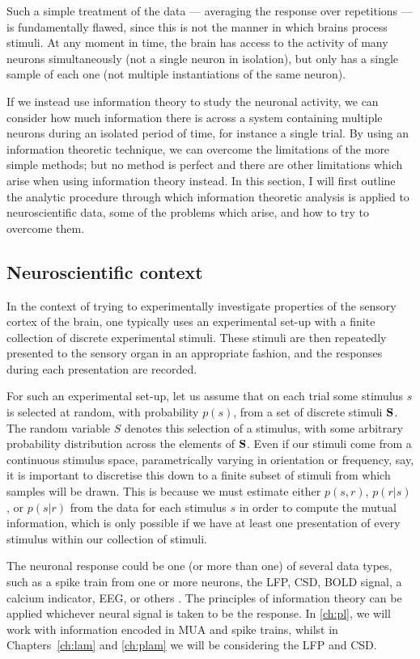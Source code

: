 Such a simple treatment of the data --- averaging the response over repetitions --- is fundamentally flawed, since this is not the manner in which brains process stimuli.
At any moment in time, the brain has access to the activity of many neurons simultaneously (not a single neuron in isolation), but only has a single sample of each one (not multiple instantiations of the same neuron).

If we instead use information theory to study the neuronal activity, we can consider how much information there is across a system containing multiple neurons during an isolated period of time, for instance a single trial.
By using an information theoretic technique, we can overcome the limitations of the more simple methods; but no method is perfect and there are other limitations which arise when using information theory instead.
In this section, I will first outline the analytic procedure through which information theoretic analysis is applied to neuroscientific data, some of the problems which arise, and how to try to overcome them.


\subsection{Neuroscientific context}

In the context of trying to experimentally investigate properties of the sensory cortex of the brain, one typically uses an experimental set-up with a finite collection of discrete experimental stimuli.
These stimuli are then repeatedly presented to the sensory organ in an appropriate fashion, and the responses during each presentation are recorded.

For such an experimental set-up, let us assume that on each trial some stimulus $s$ is selected at random, with probability $p(s)$, from a set of discrete stimuli $\mathbf{S}$.
The random variable $S$ denotes this selection of a stimulus, with some arbitrary probability distribution across the elements of $\mathbf{S}$.
Even if our stimuli come from a continuous stimulus space, parametrically varying in orientation or frequency, say, it is important to discretise this down to a finite subset of stimuli from which samples will be drawn.
This is because we must estimate either $p(s,r)$, $p(r|s)$, or $p(s|r)$ from the data for each stimulus $s$ in order to compute the mutual information, which is only possible if we have at least one presentation of every stimulus within our collection of stimuli.

The neuronal response could be one (or more than one) of several data types, such as a spike train from one or more neurons, the \ac{LFP}, \ac{CSD}, \ac{BOLD} signal, a calcium indicator, \ac{EEG}, or others \citep{Magri2009,Quiroga2009}.
The principles of information theory can be applied whichever neural signal is taken to be the response.
In \autoref{ch:pl}, we will work with information encoded in \ac{MUA} and spike trains, whilst in Chapters~\ref{ch:lam} and \ref{ch:plam} we will be considering the \ac{LFP} and \ac{CSD}.

